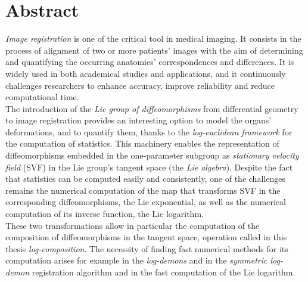 
\qquad
\pagestyle{empty}
\newpage


\section*{Abstract}

\emph{Image registration} is one of the critical tool in medical imaging. It consists in the process of alignment of two or more patients' images with the aim of determining and quantifying the occurring anatomies' correspondences and differences.
It is widely used in both academical studies and applications, and it continuously challenges researchers to enhance accuracy, improve reliability and reduce computational time.\\

The introduction of the \emph{Lie group of diffeomorphisms} from differential geometry to image registration provides an interesting option to model the organs' deformations, and to quantify them, thanks to the \emph{log-euclidean framework} for the computation of statistics.
This machinery enables the representation of diffeomorphisms embedded in the one-parameter subgroup as \emph{stationary velocity field} (SVF) in the Lie group's tangent space (the \emph{Lie algebra}). Despite the fact that statistics can be computed easily and consistently, one of the challenges remains the numerical computation of the map that transforms SVF in the corresponding diffeomorphisms, the Lie exponential, as well as the numerical computation of its inverse function, the Lie logarithm. \\

These two transformations allow in particular the computation of the composition of diffeomorphisms in the tangent space, operation called in this thesis \emph{log-composition}. 
The necessity of finding fast numerical methods for its computation arises for example in the \emph{log-demons} and in the \emph{symmetric log-demon} registration algorithm and in the fast computation of the Lie logarithm.\\

